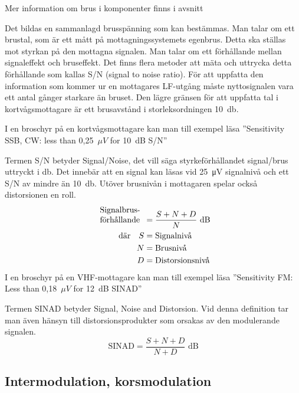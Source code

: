 Mer information om brus i komponenter finns i avsnitt 

Det bildas en sammanlagd brusspänning som kan bestämmas.
Man talar om ett brustal, som är ett mått på mottagningssystemets egenbrus.
Detta ska ställas mot styrkan på den mottagna signalen.
Man talar om ett förhållande mellan signaleffekt och bruseffekt.
Det finns flera metoder att mäta och uttrycka detta förhållande som kallas
S/N (signal to noise ratio).
För att uppfatta den information som kommer ur en mottagares LF-utgång måste
nyttosignalen vara ett antal gånger starkare än bruset.
Den lägre gränsen för att uppfatta tal i kortvågsmottagare är ett brusavstånd
i storleksordningen \SI{10}{\decibel}.



I en broschyr på en kortvågsmottagare kan man till exempel läsa
''Sensitivity SSB, CW: less than 0,25~\(\mu V\) for 10~dB S/N''

Termen S/N betyder Signal/Noise, det vill säga styrkeförhållandet signal/brus
uttryckt i \si{\decibel}.
Det innebär att en signal kan läsas vid \SI{25}{\micro\volt} signalnivå och ett
S/N av mindre än \SI{10}{\decibel}.
Utöver brusnivån i mottagaren spelar också distorsionen en roll.
\begin{align*}
  \begin{array}[b]{l}
    \text{Signalbrus-} \\
    \text{förhållande}
  \end{array} &= \frac{S + N + D}{N} \text{ dB} \\
  \text{där} \quad S &= \text{Signalnivå} \\
  N &= \text{Brusnivå} \\
  D &= \text{Distorsionsnivå} \\
\end{align*}
I en broschyr på en VHF-mottagare kan man till exempel läsa
''Sensitivity FM: Less than 0,18~\(\mu V\) for 12~dB SINAD''

Termen SINAD betyder Signal, Noise and Distorsion.
Vid denna definition tar man även hänsyn till distorsionsprodukter som orsakas
av den modulerande signalen.
\[
\text{SINAD} = \frac{S+N+D}{N+D}\text{ dB}
\]

\subsection{Intermodulation, korsmodulation}
\label{intermodulation}

